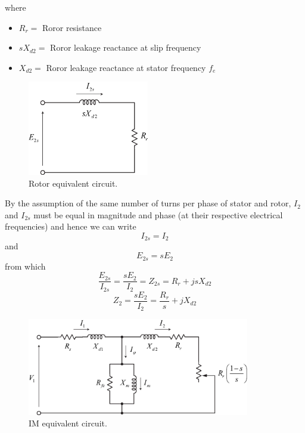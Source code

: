 \documentclass[11pt,a4paper,oneside]{book}
\numberwithin{equation}{section}
\theoremstyle{it}
\theoremstyle{definition}
\begin{document}
where

\begin{itemize}
	\item $R_r = $ Roror resistance	
	\item $sX_{d2} = $ Roror leakage reactance at slip frequency
	\item $X_{d2} = $ Roror leakage reactance at stator frequency $f_e$
\end{itemize}	

\begin{figure}[htbp]
	\centering
	\includegraphics[width = 150pt, keepaspectratio]{figures/rotor_equivalent_circuit.eps}
	\captionsetup{width=0.5\textwidth}		
	\caption{Rotor equivalent circuit.}
	\label{figure:rotor_eq_circuit} 
\end{figure}

By the assumption of the same number of turns per phase of stator and rotor, $I_2$ and $I_{2s}$ must be equal in magnitude and phase (at their respective electrical frequencies) and hence we can write
\begin{equation} \label{eq8}
	I_{2s} = I_{2}
\end{equation}
and
\begin{equation} \label{eq9}
	E_{2s} = sE_{2}
\end{equation}
from which
\begin{equation} \label{eq10}
	\frac{E_{2s}}{I_{2s}}=\frac{sE_2}{I_2}=Z_{2s}=R_r+jsX_{d2}
\end{equation}
\begin{equation} \label{eq11}
	Z_{2}=\frac{sE_2}{I_2}=\frac{R_r}{s}+jX_{d2}
\end{equation}

\begin{figure}[htbp]
	\centering
	\includegraphics[width = 275pt, keepaspectratio]{figures/equivalent_circuit.eps}
	\captionsetup{width=0.5\textwidth}		
	\caption{IM equivalent circuit.}
	\label{figure:IMeqcircuit} 
\end{figure}
\end{document}
